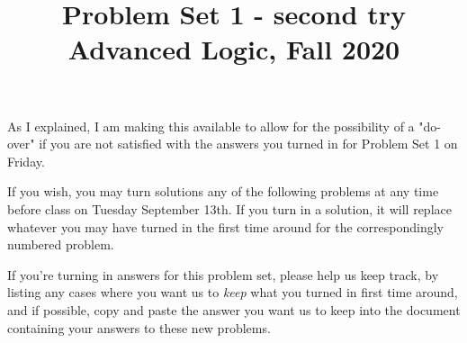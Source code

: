 \documentclass[10pt]{article}
\title{Problem Set 1 - second try Advanced Logic, Fall 2020 }
\author{}
\date{}
\begin{document}
\maketitle
As I explained, I am making this available to allow for the possibility of a "do-over" if you are not satisfied with the answers you turned in for Problem Set 1 on Friday.

If you wish, you may turn solutions any of the following problems at any time before class on Tuesday September 13th. If you turn in a solution, it will replace whatever you may have turned in the first time around for the correspondingly numbered problem.

If you're turning in answers for this problem set, please help us keep track, by listing any cases where you want us to \textit{keep} what you turned in first time around, and if possible, copy and paste the answer you want us to keep into the document containing your answers to these new problems.
\end{document}
